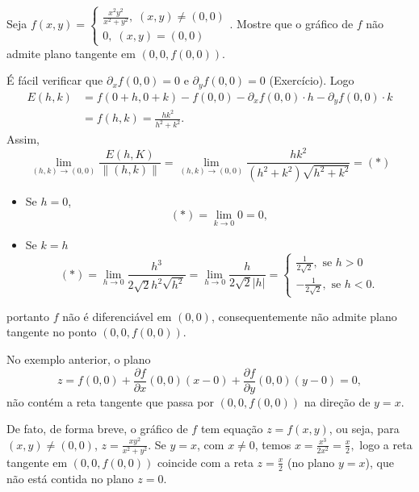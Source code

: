 \begin{example}
    Seja \(f(x,y) = \begin{cases}
        \frac{x^2y^2}{x^2+y^2},\; (x,y)\neq(0,0) \\
        0,\; (x,y)=(0,0)
    \end{cases}\). Mostre que o gráfico de \(f\) não admite plano tangente em \((0,0,f(0,0))\).

    É fácil verificar que \(\partial_x f(0,0) = 0\) e \(\partial_y f(0,0) = 0\) (Exercício). Logo
        \begin{align*}
            E(h,k) 
                & = f(0+h,0+k) - f(0,0) - \partial_x f(0,0)\cdot h - \partial_y f(0,0)\cdot k \\
                & = f(h,k) = \frac{hk^2}{h^2+k^2}.
        \end{align*}
    Assim, \[\lim_{(h,k)\to(0,0)} \frac{E(h,K)}{\|(h,k)\|} = \lim_{(h,k)\to(0,0)} \frac{hk^2}{(h^2+k^2)\sqrt{h^2+k^2}} = (*)\]
        \begin{itemize}
            \item Se \(h=0\), \[(*) = \lim_{k\to 0} 0 = 0,\]
            \item Se \(k=h\) \[(*) = \lim_{h\to 0} \frac{h^3}{2\sqrt{2}h^2\sqrt{h^2}} = \lim_{h\to 0} \frac{h}{2\sqrt{2}|h|} = \begin{cases}
                \frac{1}{2\sqrt{2}}, \text{ se } h>0 \\
                -\frac{1}{2\sqrt{2}}, \text{ se } h<0.
            \end{cases}\]
        \end{itemize}
portanto \(f\) não é diferenciável em \((0,0)\), consequentemente não admite plano tangente no ponto \((0,0,f(0,0))\).
\end{example}

\begin{remark}
    No exemplo anterior, o plano \[z = f(0,0) + \frac{\partial f}{\partial x}(0,0)(x-0) + \frac{\partial f}{\partial y}(0,0)(y-0) = 0,\] não contém a reta tangente que passa por \((0,0,f(0,0))\) na direção de \(y=x\).

    De fato, de forma breve, o gráfico de \(f\) tem equação \(z = f(x,y)\), ou seja, para \((x,y)\neq(0,0)\), \(z = \frac{xy^2}{x^2+y^2}\). Se \(y=x\), com \(x\neq 0\), temos \(x = \frac{x^3}{2x^2} = \frac{x}{2},\) logo a reta tangente em \((0,0,f(0,0))\) coincide com a reta \(z = \frac{x}{2}\) (no plano \(y=x\)), que não está contida no plano \(z = 0\).
\end{remark}

